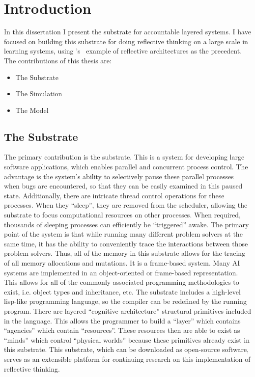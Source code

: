 \chapter{Introduction}
\label{chapter:introduction}

In this dissertation I present the substrate for accountable layered
systems.  I have focused on building this substrate for doing
reflective thinking on a large scale in learning systems, using
{\mbox{\citeauthor{singh:2005b}'s~\citeyearpar{singh:2005b}}} example
of reflective architectures as the precedent.  The contributions of
this thesis are:

\begin{itemize}
\item The Substrate
\item The Simulation
\item The Model
\end{itemize}
  
\section{The Substrate}

The primary contribution is the substrate.  This is a system for
developing large software applications, which enables parallel and
concurrent process control.  The advantage is the system's ability to
selectively pause these parallel processes when bugs are encountered,
so that they can be easily examined in this paused state.
Additionally, there are intricate thread control operations for these
processes.  When they ``sleep'', they are removed from the scheduler,
allowing the substrate to focus computational resources on other
processes.  When required, thousands of sleeping processes can
efficiently be ``triggered'' awake.  The primary point of the system
is that while running many different problem solvers at the same time,
it has the ability to conveniently trace the interactions between
those problem solvers.  Thus, all of the memory in this substrate
allows for the tracing of all memory allocations and mutations.  It is
a frame-based system.  Many AI systems are implemented in an
object-oriented or frame-based representation.  This allows for all of
the commonly associated programming methodologies to exist, i.e.
object types and inheritance, etc.  The substrate includes a
high-level lisp-like programming language, so the compiler can be
redefined by the running program.  There are layered ``cognitive
architecture'' structural primitives included in the language.  This
allows the programmer to build a ``layer'' which contains ``agencies''
which contain ``resources''.  These resources then are able to exist
as ``minds'' which control ``physical worlds'' because these
primitives already exist in this substrate.  This substrate, which can
be downloaded as open-source software, serves as an extensible
platform for continuing research on this implementation of reflective
thinking.

